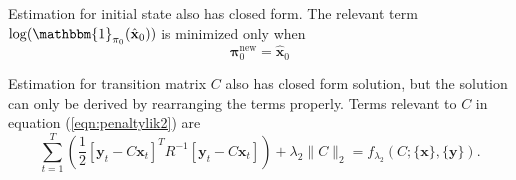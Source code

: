 \documentclass[fleqn]{article}
\let\oldref\ref
\renewcommand{\ref}[1]{(\oldref{#1})}
\newcommand{\T}{T}
\begin{document}
Estimation for initial state also has closed form. The relevant term $\log(\mathbbm{1}_{\mathbf{\pi}_0}(\hat{\mathbf{x}}_0))$ is minimized only when
\begin{equation*}\label{eq:updatepi}
\mathbf{\pi}_0^{\text{new}} = \hat{\mathbf{x}}_0
\end{equation*}

Estimation for transition matrix $C$ also has closed form solution, but the solution can only be derived by rearranging the terms properly. Terms relevant to $C$ in equation \ref{eqn:penaltylik2} are
\begin{equation}\label{eq:penaltylik1}
\sum\limits_{t=1}^{T}\left(\frac{1}{2}[\mathbf{y}_t-C\mathbf{x}_t]^{\T}R^{-1}[\mathbf{y}_t-C\mathbf{x}_t]\right)+\lambda_2 \|C\|_2 = f_{\lambda_2}(C;\{\mathbf{x}\},\{\mathbf{y}\}).
\end{equation}
\end{document}
